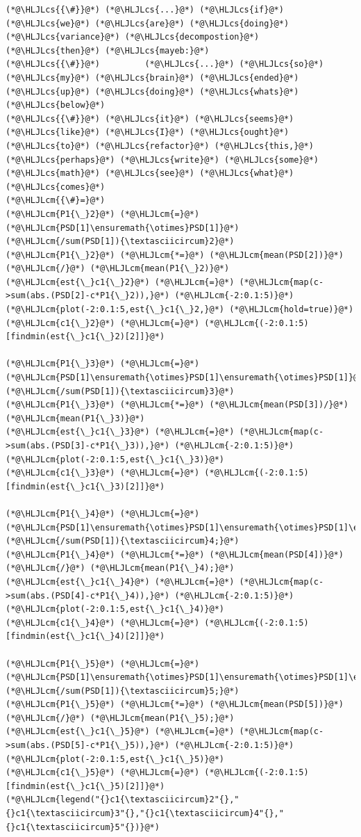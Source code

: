 \documentclass[12pt,a4paper]{article}
\newcommand{\HLJLcm}[1]{\textcolor[RGB]{153,153,119}{\textit{#1}}}
\newcommand{\HLJLcs}[1]{\textcolor[RGB]{153,153,119}{\textit{#1}}}
\begin{document}
\begin{lstlisting}
(*@\HLJLcs{{\#}}@*) (*@\HLJLcs{...}@*) (*@\HLJLcs{if}@*) (*@\HLJLcs{we}@*) (*@\HLJLcs{are}@*) (*@\HLJLcs{doing}@*) (*@\HLJLcs{variance}@*) (*@\HLJLcs{decompostion}@*) (*@\HLJLcs{then}@*) (*@\HLJLcs{mayeb:}@*)
(*@\HLJLcs{{\#}}@*)			(*@\HLJLcs{...}@*) (*@\HLJLcs{so}@*) (*@\HLJLcs{my}@*) (*@\HLJLcs{brain}@*) (*@\HLJLcs{ended}@*) (*@\HLJLcs{up}@*) (*@\HLJLcs{doing}@*) (*@\HLJLcs{whats}@*) (*@\HLJLcs{below}@*)
(*@\HLJLcs{{\#}}@*)	(*@\HLJLcs{it}@*) (*@\HLJLcs{seems}@*) (*@\HLJLcs{like}@*) (*@\HLJLcs{I}@*) (*@\HLJLcs{ought}@*) (*@\HLJLcs{to}@*) (*@\HLJLcs{refactor}@*) (*@\HLJLcs{this,}@*) (*@\HLJLcs{perhaps}@*) (*@\HLJLcs{write}@*) (*@\HLJLcs{some}@*) (*@\HLJLcs{math}@*) (*@\HLJLcs{see}@*) (*@\HLJLcs{what}@*) (*@\HLJLcs{comes}@*)
(*@\HLJLcm{{\#}=}@*)
(*@\HLJLcm{P1{\_}2}@*) (*@\HLJLcm{=}@*) (*@\HLJLcm{PSD[1]\ensuremath{\otimes}PSD[1]}@*) (*@\HLJLcm{/sum(PSD[1]){\textasciicircum}2}@*)
(*@\HLJLcm{P1{\_}2}@*) (*@\HLJLcm{*=}@*) (*@\HLJLcm{mean(PSD[2])}@*) (*@\HLJLcm{/}@*) (*@\HLJLcm{mean(P1{\_}2)}@*)
(*@\HLJLcm{est{\_}c1{\_}2}@*) (*@\HLJLcm{=}@*) (*@\HLJLcm{map(c->sum(abs.(PSD[2]-c*P1{\_}2)),}@*) (*@\HLJLcm{-2:0.1:5)}@*)
(*@\HLJLcm{plot(-2:0.1:5,est{\_}c1{\_}2,}@*) (*@\HLJLcm{hold=true)}@*)
(*@\HLJLcm{c1{\_}2}@*) (*@\HLJLcm{=}@*) (*@\HLJLcm{(-2:0.1:5)[findmin(est{\_}c1{\_}2)[2]]}@*)

(*@\HLJLcm{P1{\_}3}@*) (*@\HLJLcm{=}@*) (*@\HLJLcm{PSD[1]\ensuremath{\otimes}PSD[1]\ensuremath{\otimes}PSD[1]}@*) (*@\HLJLcm{/sum(PSD[1]){\textasciicircum}3}@*)
(*@\HLJLcm{P1{\_}3}@*) (*@\HLJLcm{*=}@*) (*@\HLJLcm{mean(PSD[3])/}@*) (*@\HLJLcm{mean(P1{\_}3)}@*)
(*@\HLJLcm{est{\_}c1{\_}3}@*) (*@\HLJLcm{=}@*) (*@\HLJLcm{map(c->sum(abs.(PSD[3]-c*P1{\_}3)),}@*) (*@\HLJLcm{-2:0.1:5)}@*)
(*@\HLJLcm{plot(-2:0.1:5,est{\_}c1{\_}3)}@*)
(*@\HLJLcm{c1{\_}3}@*) (*@\HLJLcm{=}@*) (*@\HLJLcm{(-2:0.1:5)[findmin(est{\_}c1{\_}3)[2]]}@*)

(*@\HLJLcm{P1{\_}4}@*) (*@\HLJLcm{=}@*) (*@\HLJLcm{PSD[1]\ensuremath{\otimes}PSD[1]\ensuremath{\otimes}PSD[1]\ensuremath{\otimes}PSD[1]}@*) (*@\HLJLcm{/sum(PSD[1]){\textasciicircum}4;}@*)
(*@\HLJLcm{P1{\_}4}@*) (*@\HLJLcm{*=}@*) (*@\HLJLcm{mean(PSD[4])}@*) (*@\HLJLcm{/}@*) (*@\HLJLcm{mean(P1{\_}4);}@*)
(*@\HLJLcm{est{\_}c1{\_}4}@*) (*@\HLJLcm{=}@*) (*@\HLJLcm{map(c->sum(abs.(PSD[4]-c*P1{\_}4)),}@*) (*@\HLJLcm{-2:0.1:5)}@*)
(*@\HLJLcm{plot(-2:0.1:5,est{\_}c1{\_}4)}@*)
(*@\HLJLcm{c1{\_}4}@*) (*@\HLJLcm{=}@*) (*@\HLJLcm{(-2:0.1:5)[findmin(est{\_}c1{\_}4)[2]]}@*)

(*@\HLJLcm{P1{\_}5}@*) (*@\HLJLcm{=}@*) (*@\HLJLcm{PSD[1]\ensuremath{\otimes}PSD[1]\ensuremath{\otimes}PSD[1]\ensuremath{\otimes}PSD[1]\ensuremath{\otimes}PSD[1]}@*) (*@\HLJLcm{/sum(PSD[1]){\textasciicircum}5;}@*)
(*@\HLJLcm{P1{\_}5}@*) (*@\HLJLcm{*=}@*) (*@\HLJLcm{mean(PSD[5])}@*) (*@\HLJLcm{/}@*) (*@\HLJLcm{mean(P1{\_}5);}@*)
(*@\HLJLcm{est{\_}c1{\_}5}@*) (*@\HLJLcm{=}@*) (*@\HLJLcm{map(c->sum(abs.(PSD[5]-c*P1{\_}5)),}@*) (*@\HLJLcm{-2:0.1:5)}@*)
(*@\HLJLcm{plot(-2:0.1:5,est{\_}c1{\_}5)}@*)
(*@\HLJLcm{c1{\_}5}@*) (*@\HLJLcm{=}@*) (*@\HLJLcm{(-2:0.1:5)[findmin(est{\_}c1{\_}5)[2]]}@*)
(*@\HLJLcm{legend("{}c1{\textasciicircum}2"{},"{}c1{\textasciicircum}3"{},"{}c1{\textasciicircum}4"{},"{}c1{\textasciicircum}5"{})}@*)


\end{lstlisting}
\end{document}
